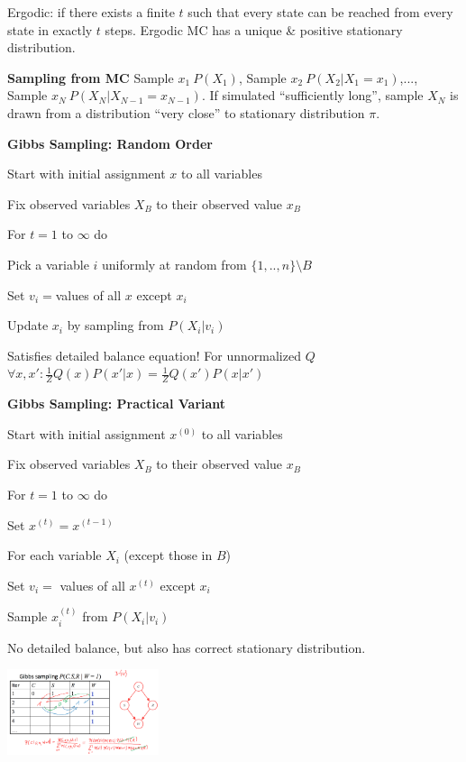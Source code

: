 \documentclass[a4paper, 11pt, landscape]{article}
\begin{document}
\begin{multicols*}{3}
Ergodic: if there exists a finite $t$ such that every state can be reached from every state in exactly $t$ steps. Ergodic MC has a unique \& positive stationary distribution.

\textbf{Sampling from MC}
Sample $x_1~P(X_1)$, Sample $x_2~P(X_2 | X_1=x_1)$,..., Sample $x_N~P(X_N | X_{N-1}=x_{N-1})$.
If simulated “sufficiently long”, sample $X_N$ is drawn from a distribution “very close” to stationary distribution $\pi$.


\textbf{Gibbs Sampling: Random Order}
\begin{compactitem}
\item Start with initial assignment $x$ to all variables
\item Fix observed variables $X_B$ to their observed value $x_B$
\item For $t=1$ to $\infty$ do
\begin{compactenum}
\item Pick a variable $i$ uniformly at random from $\{1,..,n\} \setminus B$
\item Set $v_i = $values of all $x$ except $x_i$
\item Update $x_i$ by sampling from $P(X_i | v_i)$
\end{compactenum}
\end{compactitem}
Satisfies detailed balance equation! For unnormalized $Q$  $\forall x, x': \frac{1}{Z} Q(x)P(x'|x) = \frac{1}{Z} Q(x')P(x|x') $ 

\textbf{Gibbs Sampling: Practical Variant}
\begin{compactitem}
 \item Start with initial assignment $x^{(0)}$ to all variables
 \item Fix observed variables $X_B$ to their observed value $x_B$
 \item For $t=1$ to $\infty$ do 
\begin{compactenum}
\item Set $x^{(t)} = x^{(t-1)}$
\item For each variable $X_i$ (except those in $B$) 
\item Set $v_i =$ values of all $x^{(t)}$ except $x_i$
\item Sample $x_i^{(t)}$ from $P(X_i | v_i)$
\end{compactenum}
\end{compactitem}
No detailed balance, but also has correct stationary distribution.

\includegraphics[height=2.5cm]{img/pai3.png}


\end{multicols*}
\end{document}
